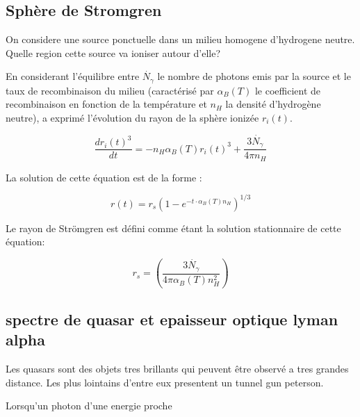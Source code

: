 \subsection{Sphère de Stromgren}

On considere une source ponctuelle dans un milieu homogene d'hydrogene neutre.
Quelle region cette source va ioniser autour d'elle?


En considerant l'équilibre entre $\dot{N_\gamma}$ le nombre de photons emis par la source et le taux de recombinaison du milieu (caractérisé par $\alpha_B(T)$ le coefficient de recombinaison en fonction de la température et $n_H$ la densité d'hydrogène neutre), \cite{stromgren_physical_1939} a exprimé l'évolution du rayon de la sphère ionizée $r_i(t)$.


\begin{equation}
\frac{dr_i(t)^3}{dt} = -n_H \alpha_B(T)r_i (t)^3 + \frac{3 \dot{N_\gamma} }{4 \pi n_H}
\end{equation}


La solution de cette équation est de la forme :

\begin{equation}
r(t) = r_s \left( 1 - e^{-t\cdot \alpha_B(T) n_H } \right)^{1/3}
\end{equation}

%

Le rayon de Strömgren est défini comme étant la solution stationnaire de cette équation:

\begin{equation}
r_s = \left( \frac{3 \dot{N_\gamma} }{4 \pi \alpha_B(T) n_H^2} \right)
\end{equation}



\subsection{spectre de quasar et epaisseur optique lyman alpha}
Les quasars sont des objets tres brillants qui peuvent être observé a tres grandes distance.
Les plus lointains d'entre eux presentent  un tunnel gun peterson.

Lorsqu'un photon d'une energie proche 


